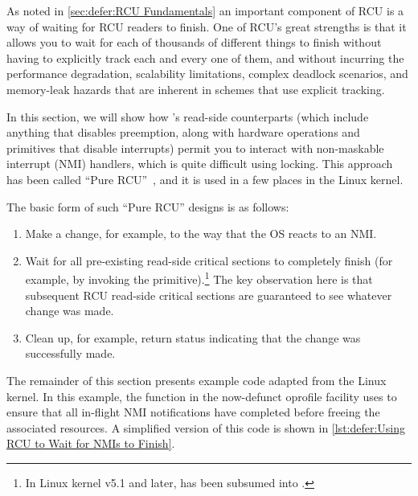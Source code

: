 As noted in \cref{sec:defer:RCU Fundamentals}
an important component
of RCU is a way of waiting for RCU readers to finish.
One of
RCU's great strengths is that it allows you to wait for each of
thousands of different things to finish without having to explicitly
track each and every one of them, and without incurring
the performance degradation, scalability limitations, complex deadlock
scenarios, and memory-leak hazards that are inherent in schemes that
use explicit tracking.

In this section, we will show how 's
read-side counterparts (which include anything that disables preemption,
along with hardware operations and
primitives that disable interrupts) permit you to interact with
non-maskable interrupt
(NMI) handlers, which is quite difficult using locking.
This approach has been called ``Pure RCU''~\cite{PaulEdwardMcKenneyPhD},
and it is used in a few places in the Linux kernel.

The basic form of such ``Pure RCU'' designs is as follows:

\begin{enumerate}
\item	Make a change, for example, to the way that the OS reacts to an NMI\@.
\item	Wait for all pre-existing read-side critical sections to
	completely finish (for example, by invoking the
	 primitive).\footnote{
		In Linux kernel v5.1 and later,  has
		been subsumed into .}
	The key observation here is that subsequent RCU read-side critical
	sections are guaranteed to see whatever change was made.
\item	Clean up, for example, return status indicating that the
	change was successfully made.
\end{enumerate}

The remainder of this section presents example code adapted from
the Linux kernel.
In this example, the  function in the now-defunct
oprofile facility uses  to ensure that all
in-flight NMI notifications have completed before freeing the associated
resources.
A simplified version of this code is shown in
\cref{lst:defer:Using RCU to Wait for NMIs to Finish}.

